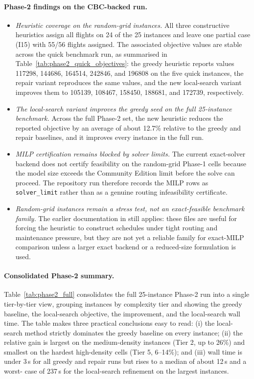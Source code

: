 \paragraph{Phase-2 findings on the CBC-backed run.}
\begin{itemize}
  \item \emph{Heuristic coverage on the random-grid instances.}  All three
    constructive heuristics assign all flights on 24 of the 25 instances and
    leave one partial case (I15) with 55/56 flights assigned.  The associated
    objective values are stable across the quick benchmark run, as summarised in
    Table~\ref{tab:phase2_quick_objectives}: the greedy heuristic reports values
    \num{117298}, \num{144686}, \num{164514}, \num{242846}, and \num{196808}
    on the five quick instances, the repair variant reproduces the same values,
    and the new local-search variant improves them to \num{105139},
    \num{108467}, \num{158450}, \num{188681}, and \num{172739}, respectively.
  \item \emph{The local-search variant improves the greedy seed on the full
    25-instance benchmark.}  Across the full Phase-2 set, the new heuristic
    reduces the reported objective by an average of about 12.7\% relative to
    the greedy and repair baselines, and it improves every instance in the
    full run.
  \item \emph{MILP certification remains blocked by solver limits.}  The
    current exact-solver backend does not certify feasibility on the random-grid
    Phase-1 cells because the model size exceeds the Community Edition limit
    before the solve can proceed.  The repository run therefore records the
    MILP rows as \texttt{solver\_limit} rather than as a genuine routing
    infeasibility certificate.
  \item \emph{Random-grid instances remain a stress test, not an exact-feasible
    benchmark family.}  The earlier documentation in
     still applies: these files are useful
    for forcing the heuristic to construct schedules under tight routing and
    maintenance pressure, but they are not yet a reliable family for exact-MILP
    comparison unless a larger exact backend or a reduced-size formulation is
    used.
\end{itemize}

\paragraph{Consolidated Phase-2 summary.}
Table~\ref{tab:phase2_full} consolidates the full 25-instance Phase-2 run
into a single tier-by-tier view, grouping instances by complexity tier and
showing the greedy baseline, the local-search objective, the improvement,
and the local-search wall time.  The table makes three practical conclusions
easy to read: (i) the local-search method strictly dominates the greedy
baseline on every instance; (ii) the relative gain is largest on the
medium-density instances (Tier 2, up to 26\%) and smallest on the hardest
high-density cells (Tier 5, 6--14\%); and (iii) wall time is under 3\,s for
all greedy and repair runs but rises to a median of about 12\,s and a worst-
case of 237\,s for the local-search refinement on the largest instances.

